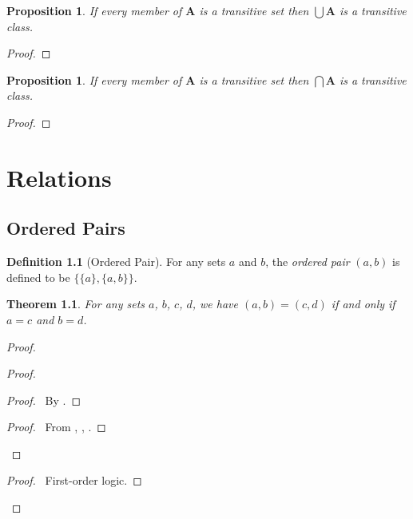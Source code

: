 \documentclass{book}
\let\qed\relax
\newtheorem{prop}[ax]{Proposition}
\newtheorem{thm}[ax]{Theorem}
\theoremstyle{definition}
\newtheorem{df}[ax]{Definition}
\begin{document}
\begin{prop}
If every member of $\mathbf{A}$ is a transitive set then $\bigcup \mathbf{A}$ is a transitive class.
\end{prop}

\begin{proof}
\pf
{}
\qed
\end{proof}

\begin{prop}
If every member of $\mathbf{A}$ is a transitive set then $\bigcap \mathbf{A}$ is a transitive class.
\end{prop}

\begin{proof}
\pf
{}
\qed
\end{proof}

\chapter{Relations}

\section{Ordered Pairs}

\begin{df}[Ordered Pair]
For any sets $a$ and $b$, the \emph{ordered pair} $(a,b)$ is defined to be $\{ \{ a \}, \{a , b \} \}$.
\end{df}

\begin{thm}
For any sets $a$, $b$, $c$, $d$, we have $(a,b) = (c,d)$ if and only if $a = c$ and $b = d$.
\end{thm}

\begin{proof}
\pf
{}
\begin{proof}
	\begin{proof}
		\pf\ By .
	\end{proof}
	\begin{proof}
		\pf\ From , , .
	\end{proof}
\end{proof}
\begin{proof}
	\pf\ First-order logic.
\end{proof}
\qed
\end{proof}
\end{document}
